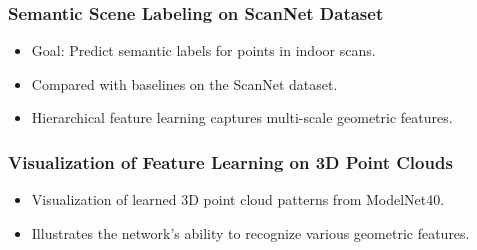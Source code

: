 \documentclass[11pt,xcolor={dvipsnames},hyperref={pdftex,pdfpagemode=UseNone,hidelinks,pdfdisplaydoctitle=true},usepdftitle=false]{beamer}
\begin{document}
\begin{frame}
\frametitle{Semantic Scene Labeling on ScanNet Dataset}
\begin{itemize}
    \item Goal: Predict semantic labels for points in indoor scans.
    \item Compared with baselines on the ScanNet dataset.
    \item Hierarchical feature learning captures multi-scale geometric features.
\end{itemize}
\end{frame}

\begin{frame}
\frametitle{Visualization of Feature Learning on 3D Point Clouds}
\begin{itemize}
    \item Visualization of learned 3D point cloud patterns from ModelNet40.
    \item Illustrates the network's ability to recognize various geometric features.
\end{itemize}
\end{frame}
\end{document}
